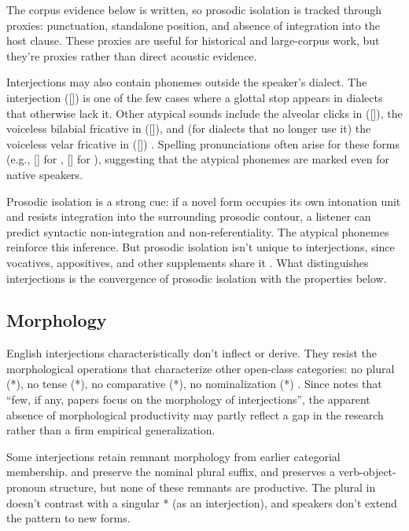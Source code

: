\documentclass[12pt]{article}
\begin{document}
The corpus evidence below is written, so prosodic isolation is tracked
through proxies: punctuation, standalone position, and absence of
integration into the host clause. These proxies are useful for historical
and large-corpus work, but they're proxies rather than direct acoustic
evidence.

Interjections may also contain phonemes outside the
speaker's dialect. The interjection  ([]) is one of
the few cases where a glottal stop appears in dialects that otherwise lack
it. Other atypical sounds include the alveolar clicks in
 ([]), the voiceless bilabial fricative in
 ([]), and (for dialects that no longer use it)
the voiceless velar fricative in  ([])
\citep[853]{quirk1985}. Spelling pronunciations often arise for these forms
(e.g., [] for , [] for
), suggesting that the atypical phonemes are marked even for
native speakers.

Prosodic isolation is a strong cue: if
a novel form occupies its own intonation unit and resists integration into
the surrounding prosodic contour, a listener can predict syntactic
non-integration and non-referentiality. The atypical phonemes reinforce this
inference. But prosodic isolation isn't unique to interjections, since
vocatives, appositives, and other supplements share it \citep[cf.][]{wilkins1992}. What
distinguishes interjections is the convergence of prosodic isolation with
the properties below.

\subsection{Morphology}

English interjections characteristically don't inflect or derive. They
resist the morphological operations that characterize other open-class
categories: no plural (*), no tense (*),
no comparative (*), no nominalization
(*) \citep[106]{ameka1992}. Since
\textcite{libert2019} notes that \enquote{few, if any, papers focus on
the morphology of interjections}, the apparent absence of morphological
productivity may partly reflect a gap in the research rather than a
firm empirical generalization.

Some interjections retain remnant morphology from earlier categorial
membership.  and  preserve the nominal
plural suffix, and  preserves a verb-object-pronoun
structure, but none of these remnants are productive. The plural in
 doesn't contrast with a singular * (as
an interjection), and speakers don't extend the pattern to new forms.
\end{document}
